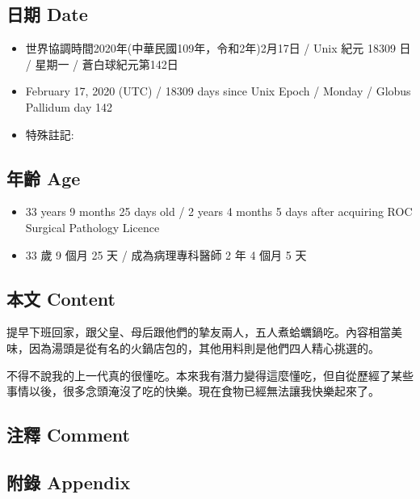 \documentclass[
]{article}
\providecommand{\tightlist}{%
  \setlength{\itemsep}{0pt}\setlength{\parskip}{0pt}}
\begin{document}
\hypertarget{ux65e5ux671f-date-78}{%
\subsection{日期 Date}\label{ux65e5ux671f-date-78}}

\begin{itemize}
\tightlist
\item
  世界協調時間2020年(中華民國109年，令和2年)2月17日 / Unix 紀元 18309 日
  / 星期一 / 蒼白球紀元第142日
\item
  February 17, 2020 (UTC) / 18309 days since Unix Epoch / Monday /
  Globus Pallidum day 142
\item
  特殊註記:
\end{itemize}

\hypertarget{ux5e74ux9f61-age-78}{%
\subsection{年齡 Age}\label{ux5e74ux9f61-age-78}}

\begin{itemize}
\tightlist
\item
  33 years 9 months 25 days old / 2 years 4 months 5 days after
  acquiring ROC Surgical Pathology Licence
\item
  33 歲 9 個月 25 天 / 成為病理專科醫師 2 年 4 個月 5 天
\end{itemize}

\hypertarget{ux672cux6587-content-78}{%
\subsection{本文 Content}\label{ux672cux6587-content-78}}

提早下班回家，跟父皇、母后跟他們的摯友兩人，五人煮蛤蠣鍋吃。內容相當美味，因為湯頭是從有名的火鍋店包的，其他用料則是他們四人精心挑選的。

不得不說我的上一代真的很懂吃。本來我有潛力變得這麼懂吃，但自從歷經了某些事情以後，很多念頭淹沒了吃的快樂。現在食物已經無法讓我快樂起來了。

\hypertarget{ux6ce8ux91cb-comment-77}{%
\subsection{注釋 Comment}\label{ux6ce8ux91cb-comment-77}}

\hypertarget{ux9644ux9304-appendix-78}{%
\subsection{附錄 Appendix}\label{ux9644ux9304-appendix-78}}
\end{document}
